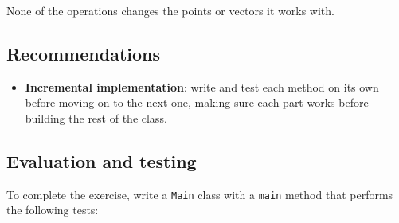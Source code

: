 None of the operations changes the points or vectors it works with.

\subsection{Recommendations}

\begin{itemize}

    \item \textbf{Incremental implementation}: write and test each method on its own before moving on to the next one, making sure each part works before building the rest of the class.

\end{itemize}

\subsection{Evaluation and testing}

To complete the exercise, write a \texttt{Main} class with a \texttt{main} method that performs the following tests:

